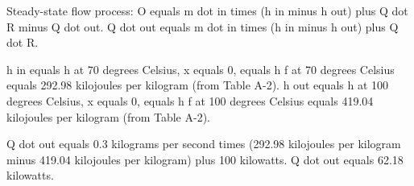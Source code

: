 Steady-state flow process:  
O equals m dot in times (h in minus h out) plus Q dot R minus Q dot out.  
Q dot out equals m dot in times (h in minus h out) plus Q dot R.  

h in equals h at 70 degrees Celsius, x equals 0, equals h f at 70 degrees Celsius equals 292.98 kilojoules per kilogram (from Table A-2).  
h out equals h at 100 degrees Celsius, x equals 0, equals h f at 100 degrees Celsius equals 419.04 kilojoules per kilogram (from Table A-2).  

Q dot out equals 0.3 kilograms per second times (292.98 kilojoules per kilogram minus 419.04 kilojoules per kilogram) plus 100 kilowatts.  
Q dot out equals 62.18 kilowatts.